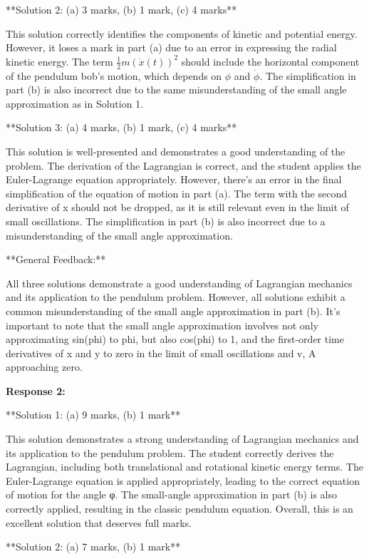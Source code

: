 \documentclass[a4paper,11pt]{article}
\begin{document}
**Solution 2: (a) 3 marks, (b) 1 mark, (c) 4 marks**

This solution correctly identifies the components of kinetic and potential energy. However, it loses a mark in part (a) due to an error in expressing the radial kinetic energy. The term \(\frac{1}{2} m (\dot{x}(t))^2 \) should include the horizontal component of the pendulum bob's motion, which depends on \(\phi\) and \(\dot{\phi}\). The simplification in part (b) is also incorrect due to the same misunderstanding of the small angle approximation as in Solution 1.

**Solution 3: (a) 4 marks, (b) 1 mark, (c) 4 marks**

This solution is well-presented and demonstrates a good understanding of the problem. The derivation of the Lagrangian is correct, and the student applies the Euler-Lagrange equation appropriately. However, there's an error in the final simplification of the equation of motion in part (a). The term with the second derivative of x should not be dropped, as it is still relevant even in the limit of small oscillations. The simplification in part (b) is also incorrect due to a misunderstanding of the small angle approximation.


**General Feedback:**

All three solutions demonstrate a good understanding of Lagrangian mechanics and its application to the pendulum problem. However, all solutions exhibit a common misunderstanding of the small angle approximation in part (b). It's important to note that the small angle approximation involves not only approximating sin(phi) to phi, but also cos(phi) to 1, and the first-order time derivatives of x and y to zero in the limit of small oscillations and v, A approaching zero.

\bigskip    
\textbf{Response 2:}

**Solution 1: (a) 9 marks, (b) 1 mark**

This solution demonstrates a strong understanding of Lagrangian mechanics and its application to the pendulum problem. The student correctly derives the Lagrangian, including both translational and rotational kinetic energy terms. The Euler-Lagrange equation is applied appropriately, leading to the correct equation of motion for the angle φ. The small-angle approximation in part (b) is also correctly applied, resulting in the classic pendulum equation. Overall, this is an excellent solution that deserves full marks.

**Solution 2: (a) 7 marks, (b) 1 mark**
\end{document}
